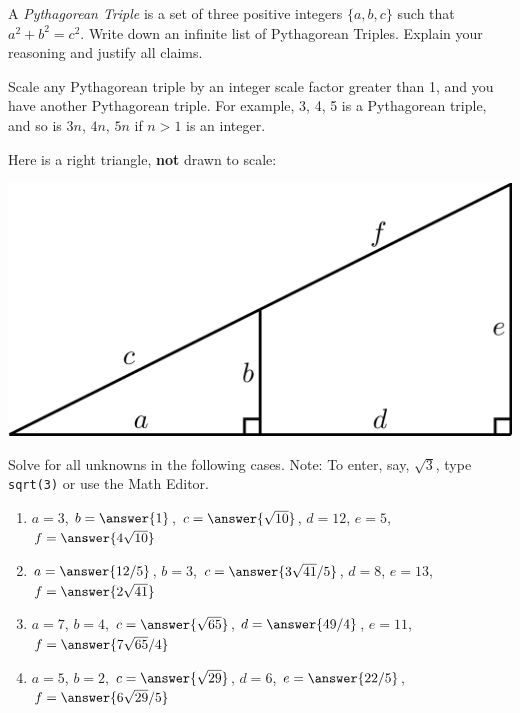 \documentclass[nooutcomes]{ximera}
\begin{document}
\begin{question}
A \textit{Pythagorean Triple} is a set
  of three positive integers $\{a,b,c\}$ such that $a^2 + b^2 =
  c^2$. Write down an infinite list of Pythagorean Triples. Explain
  your reasoning and justify all claims.
\begin{freeResponse}
\begin{hint}
Scale any Pythagorean triple by an integer scale factor greater than 1, and you have another Pythagorean triple.  For example, 3, 4, 5 is a Pythagorean triple, and so is $3n$, $4n$, $5n$ if $n > 1$ is an integer.  
\end{hint}
\end{freeResponse}
\end{question}

\begin{question}
Here is a right triangle, \textbf{not} drawn to scale:
\begin{image}
\includegraphics{origamiSimQ.png}
\end{image}
Solve for all unknowns in the following cases.  Note:  To enter, say, $\sqrt{3}$, type \texttt{sqrt(3)} or use the Math Editor. 
\begin{enumerate}
\item $a = 3$, $b = \answer{1}$, $c = \answer{\sqrt{10}}$, $d = 12$, $e = 5$, $f = \answer{4 \sqrt{10}}$
\item $a = \answer{12/5}$, $b = 3$, $c = \answer{3\sqrt{41}/5}$, $d =8$, $e = 13$, $f = \answer{2\sqrt{41}}$
\item $a = 7$, $b = 4$, $c = \answer{\sqrt{65}}$, $d =\answer{49/4}$, $e = 11$, $f = \answer{7\sqrt{65}/4}$
\item $a = 5$, $b = 2$, $c = \answer{\sqrt{29}}$, $d =6$, $e = \answer{22/5}$, $f = \answer{6\sqrt{29}/5}$
\end{enumerate}
\end{question}
\end{document}

